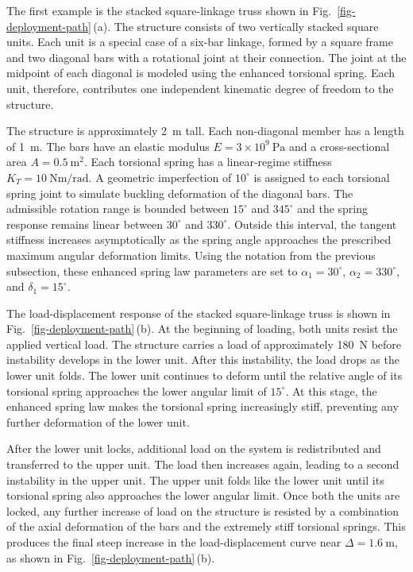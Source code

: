 The first example is the stacked square-linkage truss shown in Fig.~\ref{fig-deployment-path}\,(a). The structure consists of two vertically stacked square units. Each unit is a special case of a six-bar linkage, formed by a square frame and two diagonal bars with a rotational joint at their connection. The joint at the midpoint of each diagonal is modeled using the enhanced torsional spring. Each unit, therefore, contributes one independent kinematic degree of freedom to the structure.

The structure is approximately 2~m tall. Each non-diagonal member has a length of 1~m. The bars have an elastic modulus \(E = 3\times10^9~\text{Pa}\) and a cross-sectional area \(A = 0.5~\text{m}^2\). Each torsional spring has a linear-regime stiffness \(K_T = 10~\text{Nm/rad}\). A geometric imperfection of \(10^\circ\) is assigned to each torsional spring joint to simulate buckling deformation of the diagonal bars. The admissible rotation range is bounded between \(15^\circ\) and \(345^\circ\) and the spring response remains linear between \(30^\circ\) and \(330^\circ\). Outside this interval, the tangent stiffness increases asymptotically as the spring angle approaches the prescribed maximum angular deformation limits. Using the notation from the previous subsection, these enhanced spring law parameters are set to \(\alpha_1 = 30^\circ\), \(\alpha_2 = 330^\circ\), and \(\delta_1 = 15^\circ\).

The load-displacement response of the stacked square-linkage truss is shown in Fig.~\ref{fig-deployment-path}\,(b). At the beginning of loading, both units resist the applied vertical load. The structure carries a load of approximately 180~N before instability develops in the lower unit. After this instability, the load drops as the lower unit folds. The lower unit continues to deform until the relative angle of its torsional spring approaches the lower angular limit of \(15^\circ\). At this stage, the enhanced spring law makes the torsional spring increasingly stiff, preventing any further deformation of the lower unit.

After the lower unit locks, additional load on the system is redistributed and transferred to the upper unit. The load then increases again, leading to a second instability in the upper unit. The upper unit folds like the lower unit until its torsional spring also approaches the lower angular limit. Once both the units are locked, any further increase of load on the structure is resisted by a combination of the axial deformation of the bars and the extremely stiff torsional springs. This produces the final steep increase in the load-displacement curve near \(\Delta = 1.6~\text{m}\), as shown in Fig.~\ref{fig-deployment-path}\,(b).


